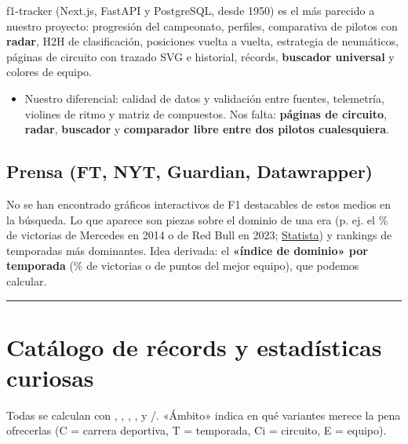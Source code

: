 f1-tracker (Next.js, FastAPI y PostgreSQL, desde 1950) es el más parecido a nuestro proyecto: progresión del campeonato, perfiles, comparativa de pilotos con \textbf{radar}, H2H de clasificación, posiciones vuelta a vuelta, estrategia de neumáticos, páginas de circuito con trazado SVG e historial, récords, \textbf{buscador universal} y colores de equipo.

\begin{itemize}
\item Nuestro diferencial: calidad de datos y validación entre fuentes, telemetría, violines de ritmo y matriz de compuestos. Nos falta: \textbf{páginas de circuito}, \textbf{radar}, \textbf{buscador} y \textbf{comparador libre entre dos pilotos cualesquiera}.
\end{itemize}

\subsection{Prensa (FT, NYT, Guardian, Datawrapper)}

No se han encontrado gráficos interactivos de F1 destacables de estos medios en la búsqueda. Lo que aparece son piezas sobre el dominio de una era (p. ej. el \% de victorias de Mercedes en 2014 o de Red Bull en 2023; \href{https://www.statista.com/chart/18556/mercedes-f1-win-ratio}{Statista}) y rankings de temporadas más dominantes. Idea derivada: el \textbf{«índice de dominio» por temporada} (\% de victorias o de puntos del mejor equipo), que \si{} podemos calcular.

\medskip\noindent\textcolor{muted!40}{\rule{\linewidth}{0.3pt}}\medskip

\section{Catálogo de récords y estadísticas curiosas}

Todas se calculan con , , , ,  y /. «Ámbito» indica en qué variantes merece la pena ofrecerlas (C = carrera deportiva, T = temporada, Ci = circuito, E = equipo).

